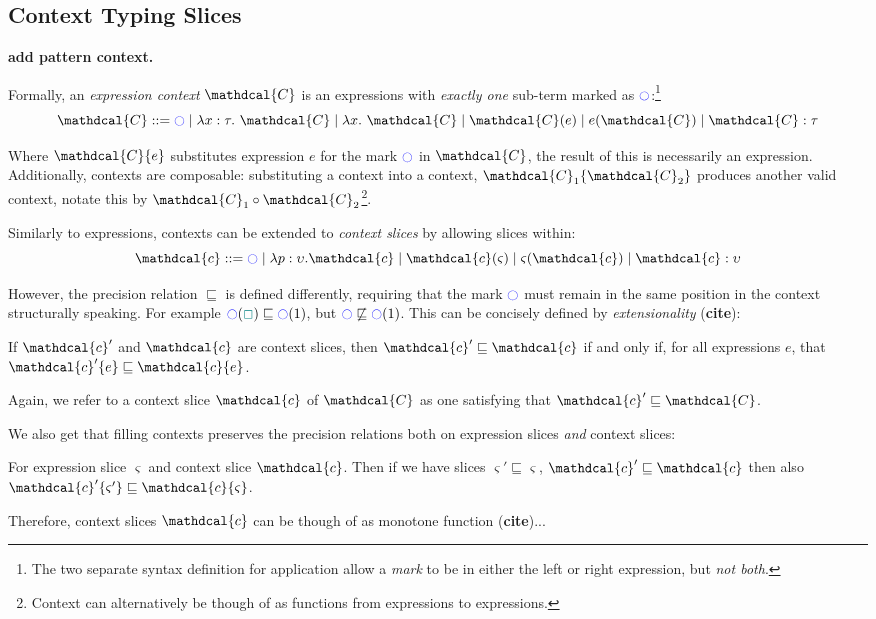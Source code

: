 \subsection{Context Typing Slices}\label{sec:ContextTypingSlices}
\textbf{add pattern context. }

\newcommand{\C}{\mathdcal{C}}
Formally, an \textit{expression context} $\mathdcal{C}$ is an expressions with \textit{exactly one} sub-term marked as $\cmark$:\footnote{The two separate syntax definition for application allow a \textit{mark} to be in either the left or right expression, but \textit{not both}.}
\[\C ::=  \cmark \mid \lambda x : \tau.\ \C \mid \lambda x.\ \C \mid \C(e) \mid e(\C) \mid \C : \tau\]

Where $\C\{e\}$ substitutes expression $e$ for the mark $\cmark$ in $\C$, the result of this is necessarily an expression. Additionally, contexts are composable: substituting a context into a context, $\C_1\{\C_2\}$ produces another valid context, notate this by $\C_1 \circ \C_2$\footnote{Context can alternatively be though of as functions from expressions to expressions.}.


\newcommand{\Cs}{\mathdcal{c}}
\newcommand{\p}{\mathdcal{p}}
Similarly to expressions, contexts can be extended to \textit{context slices} by allowing slices within:
\[\Cs ::= \cmark \mid \lambda p : \upsilon. \Cs \mid \Cs(\varsigma) \mid \varsigma(\Cs) \mid \Cs : \upsilon\]

However, the precision relation $\sqsubseteq$ is defined differently, requiring that the mark $\cmark$ must remain in the same position in the context structurally speaking. For example $\cmark(\gap) \sqsubseteq \cmark(1)$, but $\cmark \not \sqsubseteq \cmark(1)$. This can be concisely defined by \textit{extensionality} (\textbf{cite}):

\begin{definition}\label{def:ContextPrecision}
If $\Cs'$ and $\Cs$ are context slices, then $\Cs' \sqsubseteq \Cs$ if and only if, for all expressions $e$, that $\Cs'\{e\} \sqsubseteq \Cs\{e\}$.
\end{definition}
Again, we refer to a context slice $\Cs$ of $\C$ as one satisfying that $\Cs' \sqsubseteq \C$.

We also get that filling contexts preserves the precision relations both on expression slices \textit{and} context slices:
\begin{conjecture}
For expression slice $\varsigma$ and context slice $\Cs$. Then if we have slices $\varsigma' \sqsubseteq \varsigma$, $\Cs' \sqsubseteq \Cs$ then also $\Cs'\{\varsigma'\} \sqsubseteq \Cs\{\varsigma\}$.
\end{conjecture}
Therefore, context slices $\Cs$ can be though of as monotone function (\textbf{cite})...

